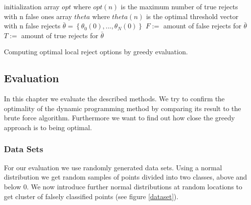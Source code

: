 \begin{algorithm}[!htbp]
 initialization\;
 array $opt$ where $opt(n)$ is the maximum number of true rejects with n false ones \;
 array $theta$ where $theta(n)$ is the optimal threshold vector with n false rejects \; 
 $\bar{\theta} = \left\{\theta_0(0),...,\theta_N(0)\right\}$ \; 
 $F :=$ amount of false rejects for $\bar{\theta}$ \;
 $T :=$ amount of true rejects for $\bar{\theta}$ \;
 \BlankLine \BlankLine
 \caption{Computing optimal local reject options by greedy evaluation.}
 \label{greedy}
\end{algorithm}

\subsection{Evaluation}
In this chapter we evaluate the described methods. We try to confirm the optimality of the dynamic programming method by comparing its result to the brute force algorithm. Furthermore we want to find out how close the greedy approach is to being optimal.

\subsubsection{Data Sets}
For our evaluation we use randomly generated data sets. Using a normal distribution we get random samples of points divided into two classes, above and below $0$. We now introduce further normal distributions at random locations to get cluster of falsely classified points (see figure \ref{dataset}).

